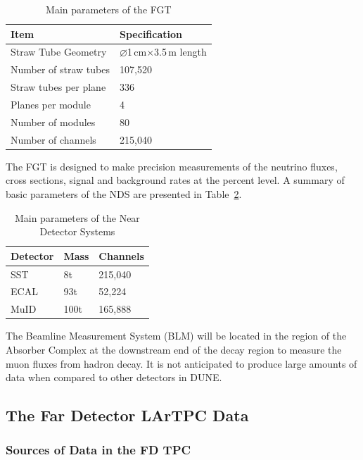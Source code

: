 \begin{table}[ht!]
\centering
\begin{tabular}{| p{2in} | p{1.5in} |}		\hline		
\textbf{Item} & \textbf{Specification} \\ \hline
Straw Tube Geometry & $\diameter$1\,cm$\times$3.5\,m length \\ \hline
Number of straw tubes & 107,520\\ \hline
Straw tubes per plane & 336 \\ \hline
Planes per module & 4 \\ \hline
Number of modules & 80 \\ \hline
Number of channels & 215,040 \\ \hline
\end{tabular}
\caption{Main parameters of the FGT}
\label{tab:fgt-params}
\end{table}

The FGT is designed to make precision measurements of the neutrino
fluxes, cross sections, signal and background rates at the percent level. A summary of basic parameters of the
NDS are presented in Table~\ref{tab:nds-params}.
\begin{table}[ht!]
\centering
\begin{tabular}{| p{1in} | p{1in} | p{1in} |}		\hline		
\textbf{Detector} & \textbf{Mass} & \textbf{Channels} \\ \hline
SST & 8t & 215,040 \\ \hline
ECAL & 93t & 52,224 \\ \hline
MuID & 100t & 165,888 \\ \hline
\end{tabular}
\caption{Main parameters of the Near Detector Systems}
\label{tab:nds-params}
\end{table}

The Beamline Measurement System (BLM) will be located in the region of the Absorber Complex
at the downstream end of the decay region to measure the muon fluxes from hadron decay.
It is not anticipated to produce large amounts of data when compared to other detectors in DUNE.

\subsection{The Far Detector LArTPC Data}
\label{sec:fd-data-overview}
\subsubsection{Sources of Data in the FD TPC}

